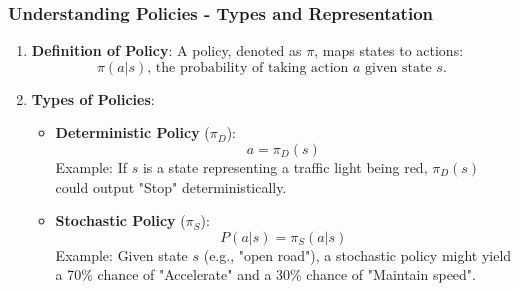 \documentclass[aspectratio=169]{beamer}
\begin{document}
\begin{frame}[fragile]
    \frametitle{Understanding Policies - Types and Representation}
    \begin{enumerate}
        \item \textbf{Definition of Policy}: A policy, denoted as \( \pi \), maps states to actions:
        \begin{equation}
            \pi(a | s) \text{, the probability of taking action } a \text{ given state } s.
        \end{equation}
        
        \item \textbf{Types of Policies}:
        \begin{itemize}
            \item \textbf{Deterministic Policy} (\( \pi_D \)):
            \begin{equation}
                a = \pi_D(s)
            \end{equation}
            Example: If \( s \) is a state representing a traffic light being red, \( \pi_D(s) \) could output "Stop" deterministically.
            
            \item \textbf{Stochastic Policy} (\( \pi_S \)):
            \begin{equation}
                P(a | s) = \pi_S(a | s)
            \end{equation}
            Example: Given state \( s \) (e.g., "open road"), a stochastic policy might yield a 70\% chance of "Accelerate" and a 30\% chance of "Maintain speed".
        \end{itemize}
    \end{enumerate}
\end{frame}
\end{document}
